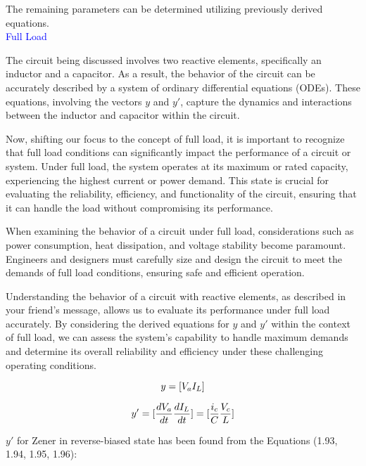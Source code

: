 The remaining parameters can be determined utilizing previously derived equations.\\

\textcolor{blue}{Full Load}

The circuit being discussed involves two reactive elements, specifically an inductor and a capacitor. As a result, the behavior of the circuit can be accurately described by a system of ordinary differential equations (ODEs). These equations, involving the vectors $y$ and $y'$, capture the dynamics and interactions between the inductor and capacitor within the circuit.

Now, shifting our focus to the concept of full load, it is important to recognize that full load conditions can significantly impact the performance of a circuit or system. Under full load, the system operates at its maximum or rated capacity, experiencing the highest current or power demand. This state is crucial for evaluating the reliability, efficiency, and functionality of the circuit, ensuring that it can handle the load without compromising its performance.

When examining the behavior of a circuit under full load, considerations such as power consumption, heat dissipation, and voltage stability become paramount. Engineers and designers must carefully size and design the circuit to meet the demands of full load conditions, ensuring safe and efficient operation.

Understanding the behavior of a circuit with reactive elements, as described in your friend's message, allows us to evaluate its performance under full load accurately. By considering the derived equations for $y$ and $y'$ within the context of full load, we can assess the system's capability to handle maximum demands and determine its overall reliability and efficiency under these challenging operating conditions.

\begin{equation}
    y=[V_a\\
    I_L]
\end{equation}

\begin{equation}
    y'=[\frac{dV_a}{dt}\\
    \frac{dI_L}{dt}]=[\frac{i_c}{C}\\
    \frac{V_c}{L}]\\
\end{equation}


$y'$ for Zener in reverse-biased state has been found from the Equations (1.93, 1.94, 1.95, 1.96):\\

